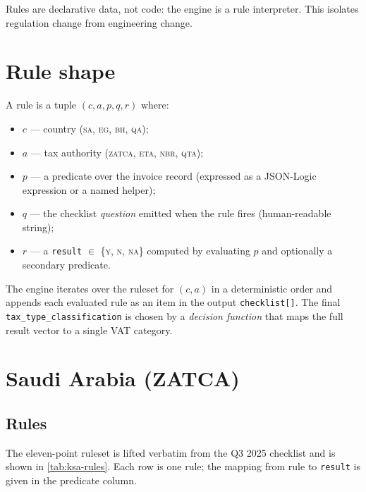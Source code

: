 \documentclass[11pt,a4paper,twoside]{report}
\begin{document}
Rules are declarative data, not code: the engine is a rule interpreter.
This isolates regulation change from engineering change.

\section{Rule shape}

A rule is a tuple \mbox{$(c, a, p, q, r)$} where:
\begin{itemize}
\item $c$ --- country (\textsc{sa}, \textsc{eg}, \textsc{bh}, \textsc{qa});
\item $a$ --- tax authority (\textsc{zatca}, \textsc{eta}, \textsc{nbr}, \textsc{qta});
\item $p$ --- a predicate over the invoice record (expressed as a JSON-Logic
expression or a named helper);
\item $q$ --- the checklist \emph{question} emitted when the rule fires
(human-readable string);
\item $r$ --- a \texttt{result} $\in$ \{\textsc{y}, \textsc{n}, \textsc{na}\}
computed by evaluating $p$ and optionally a secondary predicate.
\end{itemize}

The engine iterates over the ruleset for $(c,a)$ in a deterministic
order and appends each evaluated rule as an item in the output
\texttt{checklist[]}. The final \texttt{tax\_type\_classification} is
chosen by a \emph{decision function} that maps the full result vector to
a single VAT category.

\section{Saudi Arabia (ZATCA)}

\subsection{Rules}

The eleven-point ruleset is lifted verbatim from the Q3 2025 checklist
and is shown in \cref{tab:ksa-rules}. Each row is one rule; the
mapping from rule to \texttt{result} is given in the predicate column.
\end{document}
